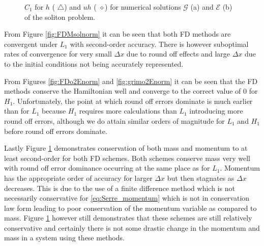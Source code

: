 \documentclass[SingleSpace,12pt,Journal]{Serre_ASCE}
\begin{document}
\begin{figure}
\centering
{}
\caption{$C_1$ for $h$ ({\color{red} $\triangle$}) and $uh$ ({\color{black} $\diamond$}) for numerical solutions $\mathcal{G}$ (a) and $\mathcal{E}$ (b) of the soliton problem.}
\label{fig:FDMsolnormC1}
\end{figure}
%
From Figure \ref{fig:FDMsolnorm} it can be seen that both FD methods are convergent under $L_1$ with second-order accuracy. There is however suboptimal rates of convergence for very small $\Delta x$ due to round off effects and large $\Delta x$ due to the initial conditions not being accurately represented.

From Figures \ref{fig:FDo2Enorm} and \ref{fig:grimo2Enorm} it can be seen that the FD methods conserve the Hamiltonian well and converge to the correct value of $0$ for $H_1$. Unfortunately, the point at which round off errors dominate is much earlier than for $L_1$ because $H_1$ requires more calculations than $L_1$ introducing more round off errors, although we do attain similar orders of magnitude for $L_1$ and $H_1$ before round off errors dominate. 

Lastly Figure \ref{fig:FDMsolnormC1} demonstrates conservation of both mass and momentum to at least second-order for both FD schemes. Both schemes conserve mass very well with round off error dominance occurring at the same place as for $L_1$. Momentum has the appropriate order of accuracy for larger $\Delta x$ but then stagnates as $\Delta x$ decreases. This is due to the use of a finite difference method which is not necessarily conservative for \eqref{eq:Serre_momentum} which is not in conservation law form leading to poor conservation of the momentum variable as compared to mass. Figure \ref{fig:FDMsolnormC1} however still demonstrates that these schemes are still relatively conservative and certainly there is not some drastic change in the momentum and mass in a system using these methods. 
\end{document}
